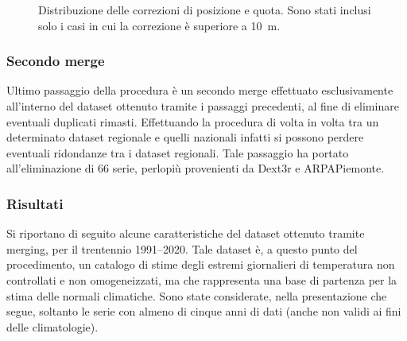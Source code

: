 \begin{figure}[ht]
  \centering
  
  \caption{Distribuzione delle correzioni di posizione e quota. Sono stati inclusi solo i casi in cui la correzione è superiore a \qty{10}{\meter}.}\label{fig:corrections-deltas}
\end{figure}

%   

\subsubsection{Secondo merge}
Ultimo passaggio della procedura è un secondo merge effettuato esclusivamente all'interno del dataset ottenuto tramite i passaggi precedenti, al fine di eliminare eventuali duplicati rimasti. Effettuando la procedura di volta in volta tra un determinato dataset regionale e quelli nazionali infatti si possono perdere eventuali ridondanze tra i dataset regionali. Tale passaggio ha portato all'eliminazione di 66 serie, perlopiù provenienti da Dext3r e ARPAPiemonte.

\subsubsection{Risultati}\label{ch:results}
Si riportano di seguito alcune caratteristiche del dataset ottenuto tramite merging, per il trentennio 1991--2020. Tale dataset è, a questo punto del procedimento, un catalogo di stime degli estremi giornalieri di temperatura non controllati e non omogeneizzati, ma che rappresenta una base di partenza per la stima delle normali climatiche. Sono state considerate, nella presentazione che segue, soltanto le serie con almeno di cinque anni di dati (anche non validi ai fini delle climatologie).

